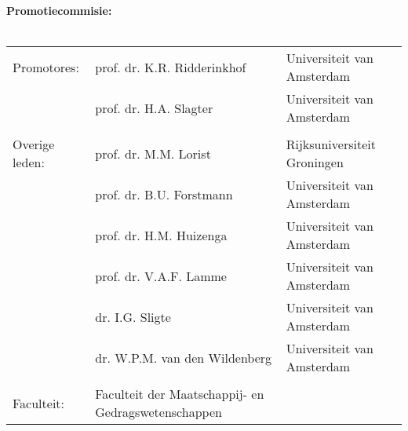 {%
\clearpage
\noindent%
{\bf Promotiecommisie:}\\
\\
\begin{tabular}[t]{@{}lll}
Promotores:    & prof. dr. K.R. Ridderinkhof    & Universiteit van Amsterdam \\  %
               & prof. dr. H.A. Slagter         & Universiteit van Amsterdam \\  %
\\
Overige leden: & prof. dr. M.M. Lorist          & Rijksuniversiteit Groningen \\ %
               & prof. dr. B.U. Forstmann       & Universiteit van Amsterdam \\  %
               & prof. dr. H.M. Huizenga        & Universiteit van Amsterdam \\  %
               & prof. dr. V.A.F. Lamme         & Universiteit van Amsterdam \\  %
               & dr. I.G. Sligte                & Universiteit van Amsterdam \\  %
               & dr. W.P.M. van den Wildenberg  & Universiteit van Amsterdam \\  %
\\
Faculteit:     & Faculteit der Maatschappij- en Gedragswetenschappen \\ %
\end{tabular}\\

\clearpage
} %